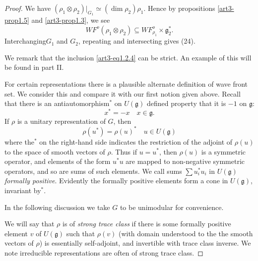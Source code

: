\begin{proof}
We have $(\rho_{1}\otimes \rho_{2})|_{G_{1}}\simeq (\dim \rho_{2})\rho_{1}$. Hence by propositions \ref{art3-prop1.5} and \ref{art3-prop1.3}, we see
$$
WF^{o}(\rho_{1}\otimes \rho_{2})\subseteq WF^{o}_{\rho_{1}}\times \mathfrak{g}^{*}_{2}.
$$
Interchanging\pageoriginale $G_{1}$ and $G_{2}$, repeating and intersecting gives (24).

We remark that the inclusion \ref{art3-eq1.2.4} can be strict. An example of this will be found in part II.

For certain representations there is a plausible alternate definition of wave front set. We consider this and compare it with our first notion given above. Recall that there is an antiautomorphism$^{*}$ on $U(\mathfrak{g})$ defined property that it is $-1$ on $\mathfrak{g}$:
$$
x^{*}=-x\quad x\in \mathfrak{g}.
$$
If $\rho$ is a unitary representation of $G$, then
\begin{equation*}
\rho(u^{*})=\rho(u)^{*}\quad u\in U(\mathfrak{g})\tag{1.26}\label{art3-eq1.26}
\end{equation*}
where the$^{*}$ on the right-hand side indicates the restriction of the adjoint of $\rho(u)$ to the space of smooth vectors of $\rho$. Thus if $u=u^{*}$, then $\rho(u)$ is a symmetric operator, and elements of the form $u^{*}u$ are mapped to non-negative symmetric operators, and so are sums of such elements. We call sums $\sum u_{i}^{*}u_{i}$ in $U(\mathfrak{g})$ {\em formally positive}. Evidently the formally positive elements form a cone in $U(\mathfrak{g})$, invariant by$^{*}$.

In the following discussion we take $G$ to be unimodular for convenience. 

We will say that $\rho$ is of {\em strong trace class} if there is some formally positive element $v$ of $U(\mathfrak{g})$ such that $\rho(v)$ (with domain understood to the the smooth vectors of $\rho$) is essentially self-adjoint, and invertible with trace class inverse. We note irreducible representations are often of strong trace class.


\end{proof}
